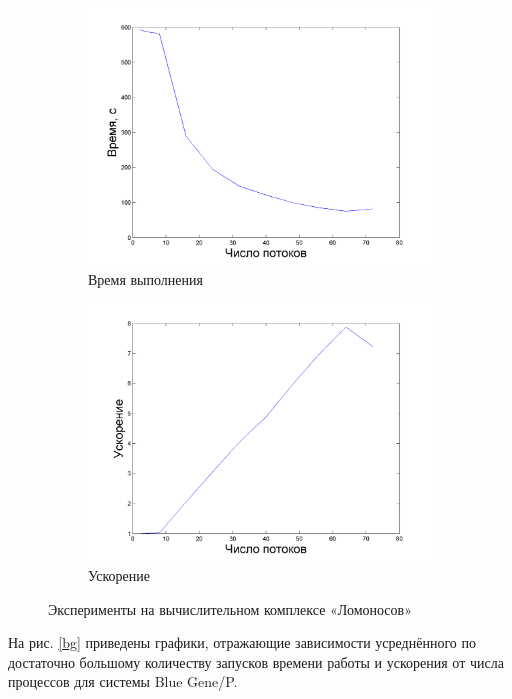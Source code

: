 \documentclass[a4paper,12pt]{report}
\begin{document}
	\begin{figure}[H]
			\begin{subfigure}{0.5\textwidth}
				\includegraphics[width=\textwidth]{mpi_lom.png}
				\caption{Время выполнения}
			\end{subfigure}
			\begin{subfigure}{0.5\textwidth}
				\includegraphics[width=\textwidth]{mpi_lom_speedup.png}
				\caption{Ускорение}
			\end{subfigure}
			\caption{Эксперименты на вычислительном комплексе «Ломоносов»}
			\label{lom}
		\end{figure}\par
	\par На рис. \ref{bg} приведены графики, отражающие зависимости усреднённого по достаточно большому количеству запусков времени работы и ускорения от числа процессов для системы Blue Gene/P.
	
\end{document}
